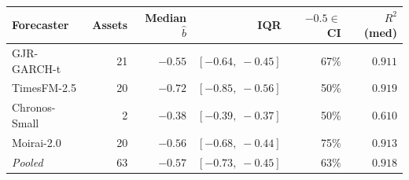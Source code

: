 \begin{tabular}{lrrrrr}
\toprule
Forecaster & Assets & Median $\hat{b}$ & IQR & $-0.5 \in$ CI & $R^2$ (med) \\
\midrule
  GJR-GARCH-t & 21 & $-0.55$ & $[-0.64,\;-0.45]$ & 67\% & $0.911$ \\
  TimesFM-2.5 & 20 & $-0.72$ & $[-0.85,\;-0.56]$ & 50\% & $0.919$ \\
  Chronos-Small & 2 & $-0.38$ & $[-0.39,\;-0.37]$ & 50\% & $0.610$ \\
  Moirai-2.0 & 20 & $-0.56$ & $[-0.68,\;-0.44]$ & 75\% & $0.913$ \\
\midrule
  \textit{Pooled} & 63 & $-0.57$ & $[-0.73,\;-0.45]$ & 63\% & $0.918$ \\
\bottomrule
\end{tabular}